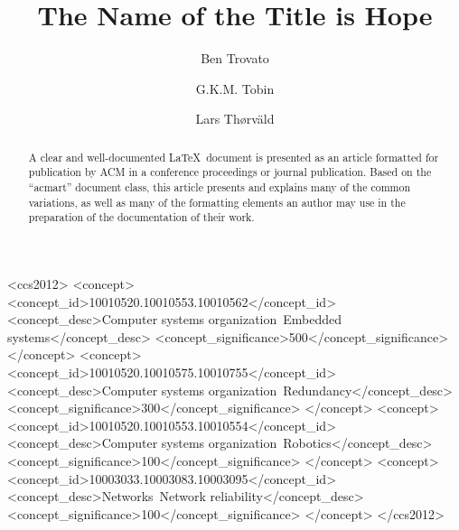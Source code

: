 \documentclass[acmsmall]{acmart}
\begin{document}
\title{The Name of the Title is Hope}

\author{Ben Trovato}
\author{G.K.M. Tobin}
\authornotemark[1]

\author{Lars Th{\o}rv{\"a}ld}


\renewcommand{\shortauthors}{Trovato and Tobin, et al.}

\begin{abstract}
  A clear and well-documented \LaTeX\ document is presented as an
  article formatted for publication by ACM in a conference proceedings
  or journal publication. Based on the ``acmart'' document class, this
  article presents and explains many of the common variations, as well
  as many of the formatting elements an author may use in the
  preparation of the documentation of their work.
\end{abstract}

\begin{CCSXML}
<ccs2012>
 <concept>
  <concept_id>10010520.10010553.10010562</concept_id>
  <concept_desc>Computer systems organization~Embedded systems</concept_desc>
  <concept_significance>500</concept_significance>
 </concept>
 <concept>
  <concept_id>10010520.10010575.10010755</concept_id>
  <concept_desc>Computer systems organization~Redundancy</concept_desc>
  <concept_significance>300</concept_significance>
 </concept>
 <concept>
  <concept_id>10010520.10010553.10010554</concept_id>
  <concept_desc>Computer systems organization~Robotics</concept_desc>
  <concept_significance>100</concept_significance>
 </concept>
 <concept>
  <concept_id>10003033.10003083.10003095</concept_id>
  <concept_desc>Networks~Network reliability</concept_desc>
  <concept_significance>100</concept_significance>
 </concept>
</ccs2012>
\end{CCSXML}
\end{document}
